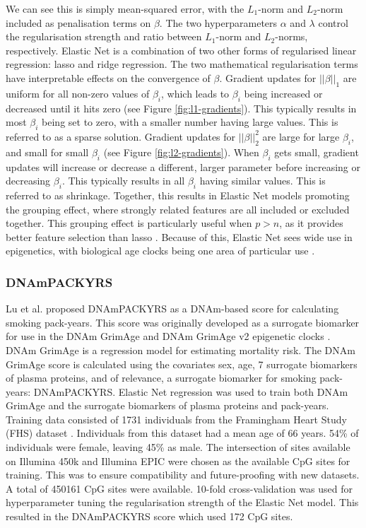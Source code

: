 \documentclass{article} %
\begin{document}
We can see this is simply mean-squared error, with the \(L_1\)-norm and \(L_2\)-norm included as penalisation terms on \(\beta\). The two hyperparameters \(\alpha\) and \(\lambda\) control the regularisation strength and ratio between \(L_1\)-norm and \(L_2\)-norms, respectively. Elastic Net is a combination of two other forms of regularised linear regression: lasso \cite{tibshirani1996regression} and ridge \cite{hoerl1970ridge} regression. The two mathematical regularisation terms have interpretable effects on the convergence of \(\beta\). Gradient updates for \(||\beta||_1\) are uniform for all non-zero values of \(\beta_i\), which leads to \(\beta_i\) being increased or decreased until it hits zero (see Figure \ref{fig:l1-gradients}). This typically results in most \(\beta_i\) being set to zero, with a smaller number having large values. This is referred to as a sparse solution. Gradient updates for \(||\beta||_2^2\) are large for large \(\beta_i\), and small for small \(\beta_i\) (see Figure \ref{fig:l2-gradients}). When \(\beta_i\) gets small, gradient updates will increase or decrease a different, larger parameter before increasing or decreasing \(\beta_i\). This typically results in all \(\beta_i\) having similar values. This is referred to as shrinkage. Together, this results in Elastic Net models promoting the grouping effect, where strongly related features are all included or excluded together. This grouping effect is particularly useful when \(p > n\), as it provides better feature selection than lasso \cite{zou2005regularization}. Because of this, Elastic Net sees wide use in epigenetics, with biological age clocks being one area of particular use \cite{teschendorff2025epigenetic}.

\subsubsection{DNAmPACKYRS} \label{sec:dnampackyrs}
Lu et al. \cite{lu2019dna} proposed DNAmPACKYRS as a DNAm-based score for calculating smoking pack-years. This score was originally developed as a surrogate biomarker for use in the DNAm GrimAge \cite{lu2019dna} and DNAm GrimAge v2 epigenetic clocks \cite{lu2022dna}. DNAm GrimAge is a regression model for estimating mortality risk. The DNAm GrimAge score is calculated using the covariates sex, age, 7 surrogate biomarkers of plasma proteins, and of relevance, a surrogate biomarker for smoking pack-years: DNAmPACKYRS. Elastic Net regression was used to train both DNAm GrimAge and the surrogate biomarkers of plasma proteins and pack-years. Training data consisted of 1731 individuals from the Framingham Heart Study (FHS) dataset \cite{doi:10.2105/AJPH.41.3.279}. Individuals from this dataset had a mean age of 66 years. 54\% of individuals were female, leaving 45\% as male. The intersection of sites available on Illumina 450k and Illumina EPIC were chosen as the available CpG sites for training. This was to ensure compatibility and future-proofing with new datasets. A total of \num{450161} CpG sites were available. 10-fold cross-validation was used for hyperparameter tuning the regularisation strength of the Elastic Net model. This resulted in the DNAmPACKYRS score which used 172 CpG sites.
\end{document}
